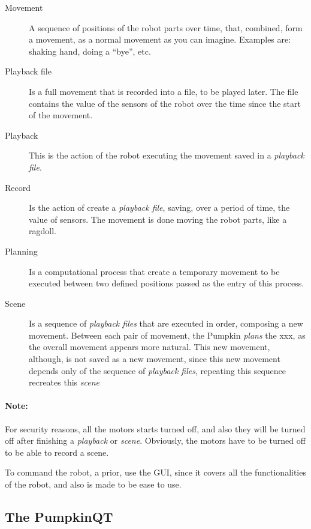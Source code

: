 \documentclass[oneside,a4paper,titlepage]{article}
\begin{document}
\begin{description}
	\item[Movement] A sequence of positions of the robot parts over time, that, combined, form a movement, as a normal movement as you can imagine. Examples are: shaking hand, doing a ``bye'', etc.
	
	\item[Playback file] Is a full movement that is recorded into a file, to be played later. The file contains the value of the sensors of the robot over the time since the start of the movement.
	
	\item[Playback] This is the action of the robot executing the movement saved in a \emph{playback file}.
	
	\item[Record] Is the action of create a \emph{playback file}, saving, over a period of time, the value of sensors. The movement is done moving the robot parts, like a ragdoll.
	
	\item[Planning] Is a computational process that create a temporary movement to be executed between two defined positions passed as the entry of this process.
	
	\item[Scene] Is a sequence of \emph{playback files} that are executed in order, composing a new movement. Between each pair of movement, the Pumpkin \emph{plans} the xxx, as the overall movement appears more natural. This new movement, although, is not saved as a new movement, since this new movement depends only of the sequence of \emph{playback files}, repeating this sequence recreates this \emph{scene}
\end{description}

\paragraph{Note: } For security reasons, all the motors starts turned off, and also they will be turned off after finishing a \emph{playback} or \emph{scene}. Obviously, the motors have to be turned off to be able to record a scene.

To command the robot, a prior, use the GUI, since it covers all the functionalities of the robot, and also is made to be ease to use.

\subsection{The PumpkinQT}
\end{document}
